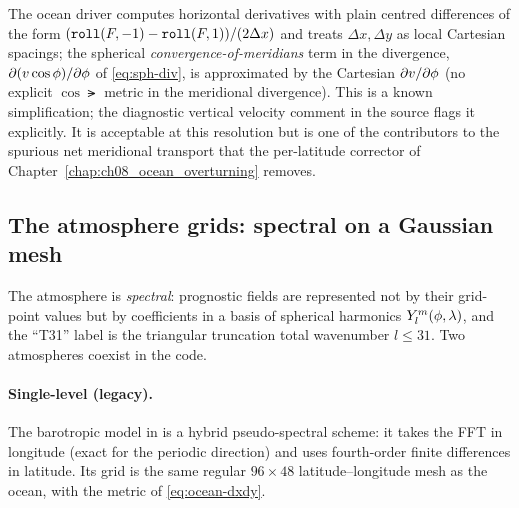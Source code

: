 \begin{remark}
The ocean driver computes horizontal derivatives with plain centred differences of the form
$(\texttt{roll}(F,-1)-\texttt{roll}(F,1))/(2\Delta x)$ and treats $\Delta x,\Delta y$ as local
Cartesian spacings; the spherical \emph{convergence-of-meridians} term in the divergence,
$\partial(v\cos\phi)/\partial\phi$ of \eqref{eq:sph-div}, is approximated by the Cartesian
$\partial v/\partial\phi$ (no explicit $\cos\lat$ metric in the meridional divergence). This is a
known simplification; the diagnostic vertical velocity comment in the source flags it explicitly.
It is acceptable at this resolution but is one of the contributors to the spurious net meridional
transport that the per-latitude corrector of Chapter~\ref{chap:ch08_ocean_overturning} removes.
\end{remark}

\subsection{The atmosphere grids: spectral on a Gaussian mesh}

The atmosphere is \emph{spectral}: prognostic fields are represented not by their grid-point
values but by coefficients in a basis of spherical harmonics $Y_l^m(\phi,\lambda)$, and the
``T31'' label is the triangular truncation total wavenumber $l\le 31$. Two atmospheres coexist
in the code.

\paragraph{Single-level (legacy).} The barotropic model in
 is a hybrid pseudo-spectral scheme: it takes the FFT in longitude (exact
for the periodic direction) and uses fourth-order finite differences in latitude. Its grid is the
same regular $96\times48$ latitude--longitude mesh as the ocean, with the metric of
\eqref{eq:ocean-dxdy}.


